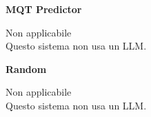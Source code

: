 \par\vspace{0.25cm}\begin{minipage}[t]{0.49\linewidth}\centering
{\color{black}\normalsize\bfseries MQT Predictor}\par\smallskip
\parbox[c][5.2cm][c]{\linewidth}{\centering\large Non applicabile\\[5pt]\normalsize Questo sistema non usa un LLM.}
\end{minipage}
\hfill\begin{minipage}[t]{0.49\linewidth}\centering
{\color{black}\normalsize\bfseries Random}\par\smallskip
\parbox[c][5.2cm][c]{\linewidth}{\centering\large Non applicabile\\[5pt]\normalsize Questo sistema non usa un LLM.}
\end{minipage}
